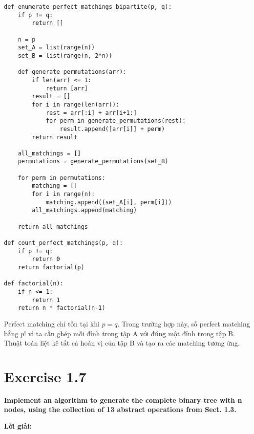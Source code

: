 \documentclass[12pt]{article}
\begin{document}
\begin{lstlisting}
def enumerate_perfect_matchings_bipartite(p, q):
    if p != q:
        return []
    
    n = p
    set_A = list(range(n))
    set_B = list(range(n, 2*n))
    
    def generate_permutations(arr):
        if len(arr) <= 1:
            return [arr]
        result = []
        for i in range(len(arr)):
            rest = arr[:i] + arr[i+1:]
            for perm in generate_permutations(rest):
                result.append([arr[i]] + perm)
        return result
    
    all_matchings = []
    permutations = generate_permutations(set_B)
    
    for perm in permutations:
        matching = []
        for i in range(n):
            matching.append((set_A[i], perm[i]))
        all_matchings.append(matching)
    
    return all_matchings

def count_perfect_matchings(p, q):
    if p != q:
        return 0
    return factorial(p)

def factorial(n):
    if n <= 1:
        return 1
    return n * factorial(n-1)
\end{lstlisting}

Perfect matching chỉ tồn tại khi $p = q$. Trong trường hợp này, số perfect matching bằng $p!$ vì ta cần ghép mỗi đỉnh trong tập A với đúng một đỉnh trong tập B. Thuật toán liệt kê tất cả hoán vị của tập B và tạo ra các matching tương ứng.

\section{Exercise 1.7}
\textbf{Implement an algorithm to generate the complete binary tree with n nodes, using the collection of 13 abstract operations from Sect. 1.3.}

\textbf{Lời giải:}
\end{document}
